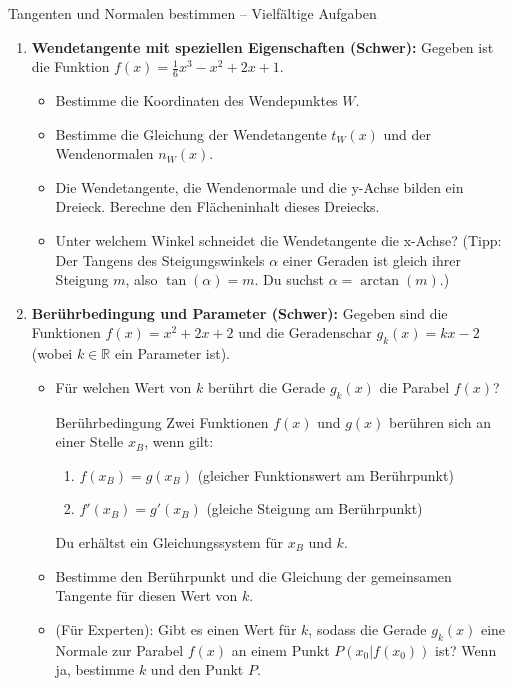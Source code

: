 \begin{aufgabenumgebung}{Tangenten und Normalen bestimmen – Vielfältige Aufgaben}
\begin{enumerate}
    \item \textbf{Wendetangente mit speziellen Eigenschaften (Schwer):}
        Gegeben ist die Funktion $f(x) = \frac{1}{6}x^3 - x^2 + 2x + 1$.
        \begin{itemize}
            \item Bestimme die Koordinaten des Wendepunktes $W$.
            \item Bestimme die Gleichung der Wendetangente $t_W(x)$ und der Wendenormalen $n_W(x)$.
            \item Die Wendetangente, die Wendenormale und die y-Achse bilden ein Dreieck. Berechne den Flächeninhalt dieses Dreiecks.
            \item Unter welchem Winkel schneidet die Wendetangente die x-Achse? (Tipp: Der Tangens des Steigungswinkels $\alpha$ einer Geraden ist gleich ihrer Steigung $m$, also $\tan(\alpha) = m$. Du suchst $\alpha = \arctan(m)$.)
        \end{itemize}

    \item \textbf{Berührbedingung und Parameter (Schwer):}
        Gegeben sind die Funktionen $f(x) = x^2 + 2x + 2$ und die Geradenschar $g_k(x) = kx - 2$ (wobei $k \in \mathbb{R}$ ein Parameter ist).
        \begin{itemize}
            \item Für welchen Wert von $k$ berührt die Gerade $g_k(x)$ die Parabel $f(x)$?
            \begin{tippumgebung}{Berührbedingung}
            Zwei Funktionen $f(x)$ und $g(x)$ berühren sich an einer Stelle $x_B$, wenn gilt:
            \begin{enumerate}
                \item $f(x_B) = g(x_B)$ (gleicher Funktionswert am Berührpunkt)
                \item $f'(x_B) = g'(x_B)$ (gleiche Steigung am Berührpunkt)
            \end{enumerate}
            Du erhältst ein Gleichungssystem für $x_B$ und $k$.
            \end{tippumgebung}
            \item Bestimme den Berührpunkt und die Gleichung der gemeinsamen Tangente für diesen Wert von $k$.
            \item (Für Experten): Gibt es einen Wert für $k$, sodass die Gerade $g_k(x)$ eine Normale zur Parabel $f(x)$ an einem Punkt $P(x_0|f(x_0))$ ist? Wenn ja, bestimme $k$ und den Punkt $P$.
        \end{itemize}
\end{enumerate}
\end{aufgabenumgebung}

